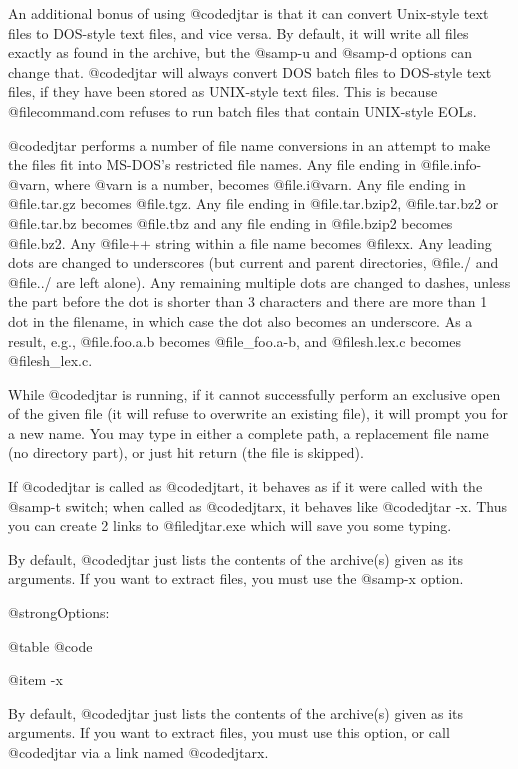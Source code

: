 An additional bonus of using @code{djtar} is that it can convert
Unix-style text files to DOS-style text files, and vice versa.  By
default, it will write all files exactly as found in the archive, but the
@samp{-u} and @samp{-d} options can change that.  @code{djtar} will
always convert DOS batch files to DOS-style text files, if they
have been stored as UNIX-style text files.  This is because
@file{command.com} refuses to run batch files that contain
UNIX-style EOLs.

@code{djtar} performs a number of file name conversions in an attempt
to make the files fit into MS-DOS's restricted file names.  Any file
ending in @file{.info-@var{n}}, where @var{n} is a number, becomes
@file{.i@var{n}}.  Any file ending in @file{.tar.gz} becomes
@file{.tgz}.  Any file ending in @file{.tar.bzip2}, @file{.tar.bz2}
or @file{.tar.bz} becomes @file{.tbz} and any file ending in
@file{.bzip2} becomes @file{.bz2}.  Any @file{++} string within
a file name becomes @file{xx}.
Any leading dots are changed to underscores (but current and parent
directories, @file{./} and @file{../} are left alone).  Any remaining
multiple dots are changed to dashes, unless the part before the dot is
shorter than 3 characters and there are more than 1 dot in the filename,
in which case the dot also becomes an underscore.  As a result, e.g.,
@file{.foo.a.b} becomes @file{_foo.a-b}, and @file{sh.lex.c} becomes
@file{sh_lex.c}.

While @code{djtar} is running, if it cannot successfully perform an
exclusive open of the given file (it will refuse to overwrite an
existing file), it will prompt you for a new name.  You may type in
either a complete path, a replacement file name (no directory part), or
just hit return (the file is skipped).

If @code{djtar} is called as @code{djtart}, it behaves as if it were
called with the @samp{-t} switch; when called as @code{djtarx}, it
behaves like @code{djtar -x}.  Thus you can create 2 links to
@file{djtar.exe} which will save you some typing.

By default, @code{djtar} just lists the contents of the archive(s)
given as its arguments.  If you want to extract files, you must use
the @samp{-x} option.

@strong{Options:}

@table @code

@item -x

By default, @code{djtar} just lists the contents of the archive(s)
given as its arguments.  If you want to extract files, you must use
this option, or call @code{djtar} via a link named @code{djtarx}.

